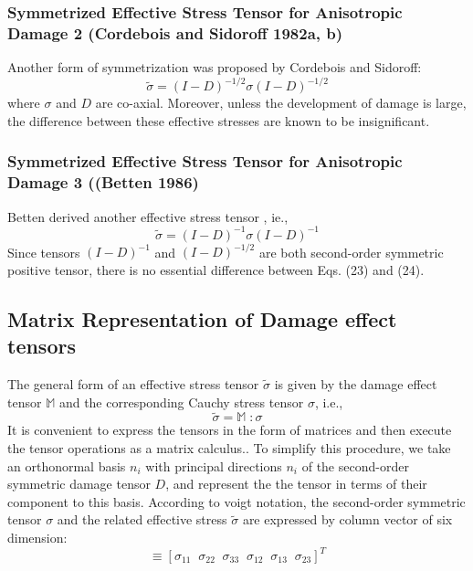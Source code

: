 \documentclass[a4paper,12pt]{article}
\begin{document}
\subsubsection{Symmetrized Effective Stress Tensor for Anisotropic Damage 2 (Cordebois and Sidoroff 1982a, b)}
\indent\indent\indent Another form of symmetrization was proposed by Cordebois and Sidoroff:
\begin{equation}
\tilde{\sigma} =  (I - D)^{-1/2}\sigma(I - D)^{-1/2}
\end{equation}
where $\sigma$ and $D$ are co-axial. Moreover, unless the development of damage is large, the difference between these effective stresses are known to be insignificant.\\
\subsubsection{Symmetrized Effective Stress Tensor for Anisotropic Damage 3 ((Betten 1986)}
\indent\indent\indent  Betten derived another effective stress tensor , ie.,
\begin{equation}
\tilde{\sigma} =  (I - D)^{-1}\sigma(I - D)^{-1}
\end{equation} 
Since tensors $(I - D)^{-1}$ and $(I - D)^{-1/2}$ are both second-order symmetric positive tensor, there is no essential difference between Eqs. (23) and (24).

\subsection{Matrix Representation of Damage effect tensors}
\indent\indent\indent The general form of an effective stress tensor $\tilde{\sigma}$ is given by the damage effect tensor $\mathbb{M}$ and the corresponding Cauchy stress tensor $\sigma$, i.e.,
\begin{equation}
\tilde{\sigma}  = \mathbb{M} \; :  \sigma  
\end{equation}
It is convenient to express the tensors in the form of matrices and then execute the tensor operations as a matrix calculus.. To simplify this procedure, we take an orthonormal basis ${n_{i}}$ with principal directions $n_{i}$ of the second-order symmetric damage tensor $D$, and represent the the tensor in terms of their component to this basis. According to voigt notation, the second-order symmetric tensor $\sigma$ and the related effective stress $\tilde{\sigma}$ are expressed by column vector of six dimension:
\begin{equation}
   [\sigma_{P}]  \equiv  [\sigma_{11} \;\; \sigma_{22} \;\;\sigma_{33} \;\;\sigma_{12} \;\;\sigma_{13} \;\;\sigma_{23} ]^{T}
\end{equation}
\end{document}
